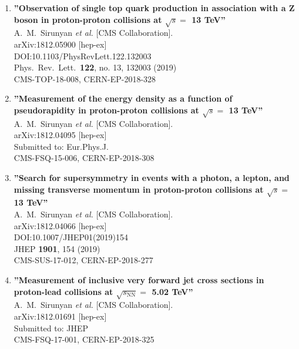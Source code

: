 \begin{enumerate}
\item%
{\bf ''Observation of single top quark production in association with a Z boson in proton-proton collisions at $\sqrt{s} =$ 13 TeV''}
  \\{}A.~M.~Sirunyan {\it et al.} [CMS Collaboration].
  \\{}arXiv:1812.05900 [hep-ex]
  \\{}DOI:10.1103/PhysRevLett.122.132003
  \\{}Phys.\ Rev.\ Lett.\  {\bf 122}, no. 13, 132003 (2019)
  \\{}CMS-TOP-18-008, CERN-EP-2018-328

\item%
{\bf ''Measurement of the energy density as a function of pseudorapidity in proton-proton collisions at $\sqrt{s}=$ 13 TeV''}
  \\{}A.~M.~Sirunyan {\it et al.} [CMS Collaboration].
  \\{}arXiv:1812.04095 [hep-ex]
  \\{}Submitted to: Eur.Phys.J.
  \\{}CMS-FSQ-15-006, CERN-EP-2018-308

\item%
{\bf ''Search for supersymmetry in events with a photon, a lepton, and missing transverse momentum in proton-proton collisions at $\sqrt{s} =$ 13 TeV''}
  \\{}A.~M.~Sirunyan {\it et al.} [CMS Collaboration].
  \\{}arXiv:1812.04066 [hep-ex]
  \\{}DOI:10.1007/JHEP01(2019)154
  \\{}JHEP {\bf 1901}, 154 (2019)
  \\{}CMS-SUS-17-012, CERN-EP-2018-277

\item%
{\bf ''Measurement of inclusive very forward jet cross sections in proton-lead collisions at $\sqrt{s_\mathrm{NN}}=$ 5.02 TeV''}
  \\{}A.~M.~Sirunyan {\it et al.} [CMS Collaboration].
  \\{}arXiv:1812.01691 [hep-ex]
  \\{}Submitted to: JHEP
  \\{}CMS-FSQ-17-001, CERN-EP-2018-325


\end{enumerate}
